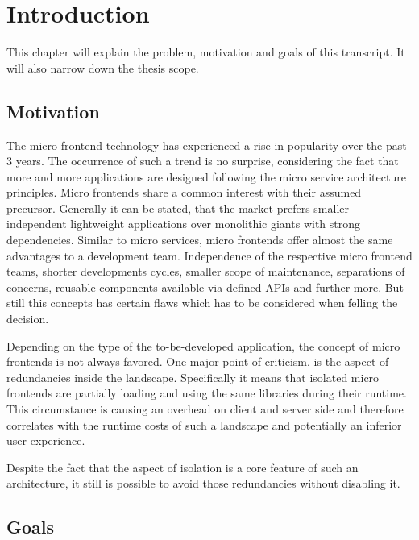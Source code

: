 \chapter{Introduction} %
\label{Chapter1}


This chapter will explain the problem, motivation and goals of this transcript. 
It will also narrow down the thesis scope.

\section{Motivation}

The micro frontend technology has experienced a rise in popularity over the past 3 years. The occurrence of such a trend is no surprise, considering the fact that more and more applications are designed following the micro service architecture principles.\cite{google_micro_frontend_trends} 
Micro frontends share a common interest with their assumed precursor. Generally it can be stated, that the market prefers smaller independent lightweight applications over monolithic giants with strong dependencies. Similar to micro services, micro frontends offer almost the same advantages to a development team. Independence of the respective micro frontend teams, shorter developments cycles, smaller scope of maintenance, separations of concerns, reusable components available via defined APIs and further more.\cite{advantages_of_mfes} But still this concepts has certain flaws which has to be considered when felling the decision.\cite{Yang_2019}

Depending on the type of the to-be-developed application, the concept of micro frontends is not always favored. One major point of criticism, is the aspect of redundancies inside the landscape. Specifically it means that isolated micro frontends are partially loading and using the same libraries during their runtime. This circumstance is causing an overhead on client and server side and therefore correlates with the runtime costs of such a landscape and potentially an inferior user experience.\cite{motivation_benefits_adopting_MFs}

Despite the fact that the aspect of isolation is a core feature of such an architecture, it still is possible to avoid those redundancies without disabling it.

\section{Goals}

